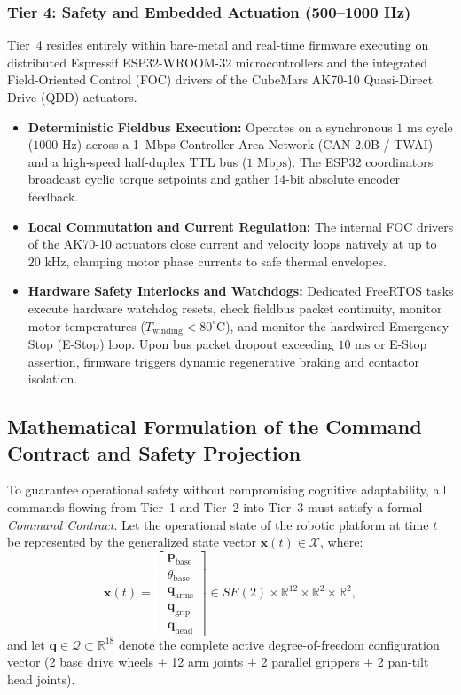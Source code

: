 \subsubsection{Tier 4: Safety and Embedded Actuation (500--1000 Hz)}
Tier~4 resides entirely within bare-metal and real-time firmware executing on distributed Espressif ESP32-WROOM-32 microcontrollers and the integrated Field-Oriented Control (FOC) drivers of the CubeMars AK70-10 Quasi-Direct Drive (QDD) actuators.
\begin{itemize}[leftmargin=1.5em]
  \item \textbf{Deterministic Fieldbus Execution:} Operates on a synchronous $1\text{ ms}$ cycle ($1000\text{ Hz}$) across a 1~Mbps Controller Area Network (CAN 2.0B / TWAI) and a high-speed half-duplex TTL bus ($1\text{ Mbps}$). The ESP32 coordinators broadcast cyclic torque setpoints and gather 14-bit absolute encoder feedback.
  \item \textbf{Local Commutation and Current Regulation:} The internal FOC drivers of the AK70-10 actuators close current and velocity loops natively at up to $20\text{ kHz}$, clamping motor phase currents to safe thermal envelopes.
  \item \textbf{Hardware Safety Interlocks and Watchdogs:} Dedicated FreeRTOS tasks execute hardware watchdog resets, check fieldbus packet continuity, monitor motor temperatures ($T_{\text{winding}} < 80^\circ\text{C}$), and monitor the hardwired Emergency Stop (E-Stop) loop. Upon bus packet dropout exceeding $10\text{ ms}$ or E-Stop assertion, firmware triggers dynamic regenerative braking and contactor isolation.
\end{itemize}

\subsection{Mathematical Formulation of the Command Contract and Safety Projection}
\label{subsec:command_contract}
To guarantee operational safety without compromising cognitive adaptability, all commands flowing from Tier~1 and Tier~2 into Tier~3 must satisfy a formal \emph{Command Contract}. Let the operational state of the robotic platform at time $t$ be represented by the generalized state vector $\mathbf{x}(t) \in \mathcal{X}$, where:
\begin{equation}
  \mathbf{x}(t) = \begin{bmatrix} \mathbf{p}_{\text{base}} \\ \theta_{\text{base}} \\ \mathbf{q}_{\text{arms}} \\ \mathbf{q}_{\text{grip}} \\ \mathbf{q}_{\text{head}} \end{bmatrix} \in SE(2) \times \mathbb{R}^{12} \times \mathbb{R}^2 \times \mathbb{R}^2,
\end{equation}
and let $\mathbf{q} \in \mathcal{Q} \subset \mathbb{R}^{18}$ denote the complete active degree-of-freedom configuration vector (2 base drive wheels + 12 arm joints + 2 parallel grippers + 2 pan-tilt head joints).

